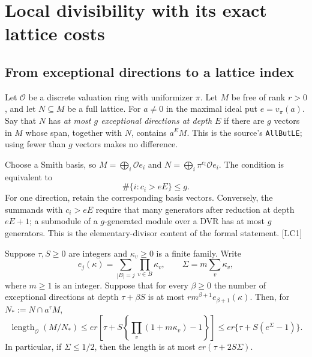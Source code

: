 \section{Local divisibility with its exact lattice costs}\label{sec:local-accounting}


\subsection{From exceptional directions to a lattice index}

Let $\mathcal O$ be a discrete valuation ring with uniformizer $\pi$. Let $M$ be free of rank $r>0$, and let $N\subseteq M$ be a full lattice. For $a\ne0$ in the maximal ideal put $e=v_\pi(a)$. Say that $N$ has \emph{at most $g$ exceptional directions at depth $E$} if there are $g$ vectors in $M$ whose span, together with $N$, contains $a^E M$. This is the source's \texttt{AllButLE}; using fewer than $g$ vectors makes no difference.\cite{local-selection,local-smith}

Choose a Smith basis, so $M=\bigoplus_i\mathcal O e_i$ and $N=\bigoplus_i\pi^{c_i}\mathcal O e_i$. The condition is equivalent to
\[
\#\{i:c_i>eE\}\le g.
\]
For one direction, retain the corresponding basis vectors. Conversely, the summands with $c_i>eE$ require that many generators after reduction at depth $eE+1$; a submodule of a $g$-generated module over a DVR has at most $g$ generators. This is the elementary-divisor content of the formal statement. \textsf{[LC1]}

\begin{proposition}\label{prop:local-index}
Suppose $\tau,S\ge0$ are integers and $\kappa_v\ge0$ is a finite family. Write
\[
e_j(\kappa)=\sum_{|B|=j}\prod_{v\in B}\kappa_v,
\qquad \Sigma=m\sum_v\kappa_v,
\]
where $m\ge1$ is an integer. Suppose that for every $\beta\ge0$ the number of exceptional directions at depth $\tau+\beta S$ is at most
$r m^{\beta+1}e_{\beta+1}(\kappa)$. Then, for $N_*:=N\cap a^\tau M$,
\begin{equation}\label{eq:local-index-exact}
\operatorname{length}_{\mathcal O}(M/N_*)
\le er\left[\tau+S\left\{\prod_v(1+m\kappa_v)-1\right\}\right]
\le er\{\tau+S(e^\Sigma-1)\}.
\end{equation}
In particular, if $\Sigma\le1/2$, then the length is at most $er(\tau+2S\Sigma)$.
\end{proposition}

